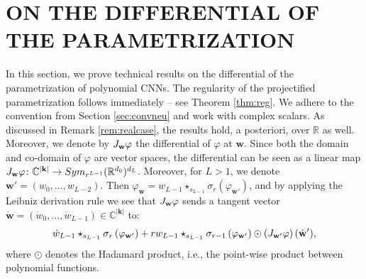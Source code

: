 \documentclass[twoside]{article}
\theoremstyle{plain}%
\theoremstyle{definition}
\theoremstyle{remark}
\newcommand{\symm}[2]{\textnormal{Sym}_{#1}(\mathbb{R}^{#2})}
\newcommand{\conv}[1]{\star_{#1}}
\begin{document}


\newpage 
\appendix 

\onecolumn 
\section{ON THE DIFFERENTIAL OF THE PARAMETRIZATION}\label{sec:proofdet}
In this section, we prove technical results on the differential of the parametrization of polynomial CNNs. The regularity of the projectified parametrization follows immediately -- see Theorem \ref{thm:reg}. We adhere to the convention from Section \ref{sec:convneu} and work with complex scalars. As discussed in Remark \ref{rem:realcase}, the results hold, a posteriori, over $\mathbb{R}$ as well. Moreover, we denote by $\textnormal{J}_\mathbf{w} \varphi$ the differential of $\varphi$ at $\mathbf{w}$. Since both the domain and co-domain of $\varphi$ are vector spaces, the differential can be seen as a linear map $\textnormal{J}_\mathbf{w} \varphi \colon \mathbb{C}^{|\mathbf{k}|} \rightarrow \symm{r^{L-1}}{d_0}^{d_L}$. Moreover, for $L>1$, we denote $\mathbf{w}' = (w_{0}, \ldots, w_{L-2})$. Then $\varphi_{\mathbf{w}} = w_{L-1} \conv{s_{L-1}} \sigma_r(\varphi_{\mathbf{w}'})$, and by applying the Leibniz derivation rule we see that $\textnormal{J}_\mathbf{w} \varphi$ sends a tangent vector $\dot{\mathbf{w}} = (\dot{w}_{0}, \ldots, \dot{w}_{L-1}) \in \mathbb{C}^{|\mathbf{k}|}$ to:
\begin{equation}\label{eq:diffhadam}
\dot{w}_{L-1} \conv{s_{L-1}} \sigma_r\left(  \varphi_{\mathbf{w}'} \right) + r w_{L-1} \conv{s_{L-1}} \sigma_{r-1}\left(  \varphi_{\mathbf{w}'} \right) \odot \left( \textnormal{J}_\mathbf{w'} \varphi \right)(\dot{\mathbf{w}}'),
\end{equation}
where $\odot$ denotes the Hadamard product, i.e., the point-wise product between polynomial functions. 
\end{document}
